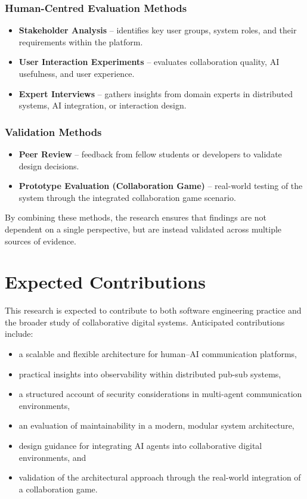 \documentclass[11pt]{article}
\begin{document}
\subsubsection{Human-Centred Evaluation Methods}

\begin{itemize}
    \item \textbf{Stakeholder Analysis} – identifies key user groups, system roles, and their requirements within the platform.
    \item \textbf{User Interaction Experiments} – evaluates collaboration quality, AI usefulness, and user experience.
    \item \textbf{Expert Interviews} – gathers insights from domain experts in distributed systems, AI integration, or interaction design.
\end{itemize}

\subsubsection{Validation Methods}

\begin{itemize}
    \item \textbf{Peer Review} – feedback from fellow students or developers to validate design decisions.
    \item \textbf{Prototype Evaluation (Collaboration Game)} – real-world testing of the system through the integrated collaboration game scenario.
\end{itemize}

By combining these methods, the research ensures that findings are not dependent on a single perspective, but are instead validated across multiple sources of evidence.

\section{Expected Contributions}

This research is expected to contribute to both software engineering practice and the broader study of collaborative digital systems. Anticipated contributions include:

\begin{itemize}
    \item a scalable and flexible architecture for human--AI communication platforms,
    \item practical insights into observability within distributed pub-sub systems,
    \item a structured account of security considerations in multi-agent communication environments,
    \item an evaluation of maintainability in a modern, modular system architecture,
    \item design guidance for integrating AI agents into collaborative digital environments, and
    \item validation of the architectural approach through the real-world integration of a collaboration game.
\end{itemize}
\end{document}
